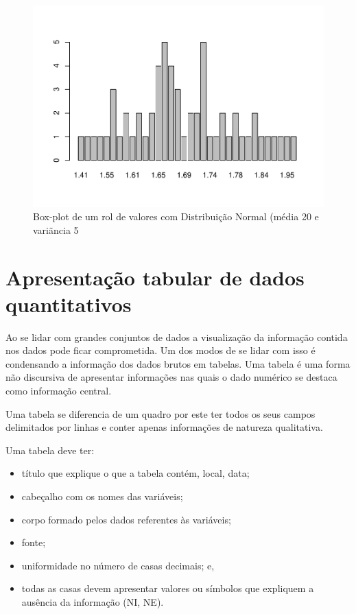 \documentclass[
]{book}
\providecommand{\tightlist}{%
  \setlength{\itemsep}{0pt}\setlength{\parskip}{0pt}}
\begin{document}
\begin{figure}

{\centering \includegraphics{apostila_files/figure-latex/unnamed-chunk-42-1} 

}

\caption{Box-plot de um rol de valores com Distribuição Normal (média 20 e variãncia 5}\label{fig:unnamed-chunk-42}
\end{figure}

\hypertarget{apresentauxe7uxe3o-tabular-de-dados-quantitativos}{%
\section{Apresentação tabular de dados quantitativos}\label{apresentauxe7uxe3o-tabular-de-dados-quantitativos}}

\hfill\break

Ao se lidar com grandes conjuntos de dados a visualização da informação contida nos dados pode ficar comprometida. Um dos modos de se lidar com isso é condensando a informação dos dados brutos em tabelas. Uma tabela é uma forma não discursiva de apresentar informações nas quais o dado numérico se destaca como informação central.

\hfill\break

Uma tabela se diferencia de um quadro por este ter todos os seus campos delimitados por linhas e conter apenas informações de natureza qualitativa.

\hfill\break

Uma tabela deve ter:

\hfill\break

\begin{itemize}
\tightlist
\item
  título que explique o que a tabela contém, local, data;
\item
  cabeçalho com os nomes das variáveis;
\item
  corpo formado pelos dados referentes às variáveis;
\item
  fonte;
\item
  uniformidade no número de casas decimais; e,
\item
  todas as casas devem apresentar valores ou símbolos que expliquem a ausência da informação (NI, NE).
\end{itemize}
\end{document}
